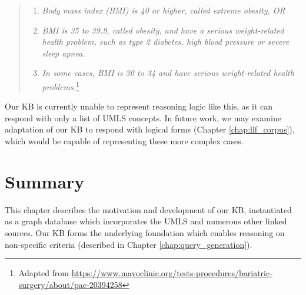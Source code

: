 \documentclass[../main.tex]{subfiles}
\begin{document}
\begin{quote}
    \begin{enumerate}
        \item \textit{Body mass index (BMI) is 40 or higher, called extreme obesity, OR}
        \item \textit{BMI is 35 to 39.9, called obesity, and have a serious weight-related health problem, such as type 2 diabetes, high blood pressure or severe sleep apnea.}
        \item \textit{In some cases, BMI is 30 to 34 and have serious weight-related health problems.}\footnote{Adapted from \url{https://www.mayoclinic.org/tests-procedures/bariatric-surgery/about/pac-20394258}}
    \end{enumerate}
\end{quote}

Our KB is currently unable to represent reasoning logic like this, as it can respond with only a list of UMLS concepts. In future work, we may examine adaptation of our KB to respond with logical forms (Chapter \ref{chap:llf_corpus}), which would be capable of representing these more complex cases.

\section{Summary}

This chapter describes the motivation and development of our KB, instantiated as a graph database which incorporates the UMLS and numerous other linked sources. Our KB forms the underlying foundation which enables reasoning on non-specific criteria (described in Chapter \ref{chap:query_generation}).
\end{document}
